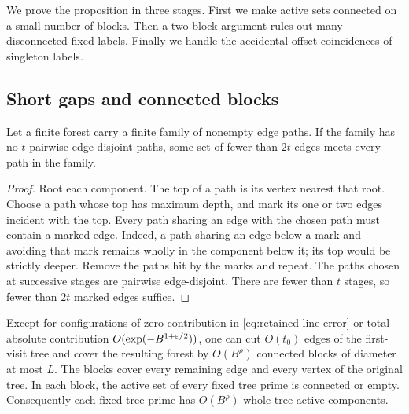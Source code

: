 We prove the proposition in three stages.  First we make active
sets connected on a small number of blocks.  Then a two-block
argument rules out many disconnected fixed labels.  Finally we
handle the accidental offset coincidences of singleton labels.

\subsection{Short gaps and connected blocks}

\begin{lemma}\label{lem:forest-path-hitting}
Let a finite forest carry a finite family of nonempty edge paths.
If the family has no $t$ pairwise edge-disjoint paths, some set of
fewer than $2t$ edges meets every path in the family.
\end{lemma}

\begin{proof}
Root each component.  The top of a path is its vertex nearest that
root.  Choose a path whose top has maximum depth, and mark its one
or two edges incident with the top.  Every path sharing an edge
with the chosen path must contain a marked edge.  Indeed, a path
sharing an edge below a mark and avoiding that mark remains wholly
in the component below it; its top would be strictly deeper.
Remove the paths hit by the marks and repeat.  The paths chosen at
successive stages are pairwise edge-disjoint.  There are fewer than
$t$ stages, so fewer than $2t$ marked edges suffice.
\end{proof}

\begin{lemma}\label{lem:activity-blocks}
Except for configurations of zero contribution in
\eqref{eq:retained-line-error} or total absolute contribution
$O(\exp(-B^{1+\varepsilon/2}))$, one can cut $O(t_0)$ edges of the
first-visit tree and cover the resulting forest by $O(B^\rho)$
connected blocks of diameter at most $L$.  The blocks cover every
remaining edge and every vertex of the original tree.  In each block,
the active set of every fixed tree prime is connected or empty.
Consequently each fixed tree prime has $O(B^\rho)$ whole-tree active
components.
\end{lemma}

